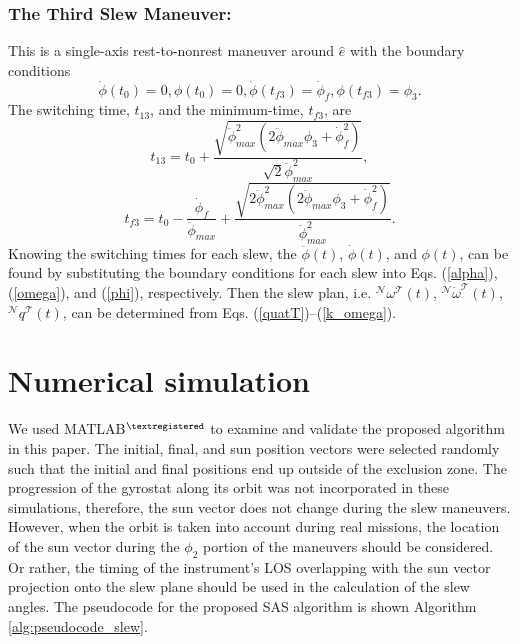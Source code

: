 \documentclass[journal ]{new-aiaa}
\begin{document}
	\subsubsection{The Third Slew Maneuver:}
	 This is a  single-axis rest-to-nonrest maneuver around $\hat{e}$ with the boundary conditions
	\begin{equation}\label{Bc3}
	\dot{\phi}(t_0)=0,\phi(t_0)=0, \dot{\phi}(t_{f3})=\dot{\phi}_{f},\phi(t_{f3})=\phi_3.
	\end{equation}
	The switching time, $t_{13}$, and the minimum-time, $t_{f3}$, are
	\begin{equation}\label{t31}
	t_{13}=t_0+\frac{\sqrt{\ddot{\phi}_{max}^2(2\ddot{\phi}_{max}\phi_3+\dot{\phi}_{f}^2)}}{\sqrt{2}\ddot{\phi}_{max}^2},
	\end{equation}
	\begin{equation}\label{tf3}
	t_{f3}=t_0-\frac{\dot{\phi}_{f}}{\ddot{\phi}_{max}}+\frac{\sqrt{2\ddot{\phi}_{max}^2(2\ddot{\phi}_{max}\phi_3+\dot{\phi}_{f}^2)}}{\ddot{\phi}_{max}^2}.
	\end{equation}
	Knowing the switching times for each slew, the $\ddot{\phi}(t)$, $\dot{\phi}(t)$, and  $\phi(t)$, can be found by substituting the boundary conditions for each slew into Eqs. (\ref{alpha}), (\ref{omega}), and (\ref{phi}), respectively. Then the slew plan, i.e. $^\mathcal{N}\omega^\mathcal{T}(t)$, $^\mathcal{N}\dot{\omega}^\mathcal{T}(t)$, $^\mathcal{N}q^\mathcal{T}(t)$, can be determined from Eqs. (\ref{quatT})--(\ref{k_omega}).	
\section{Numerical simulation} 
We used MATLAB$^{\textregistered}$ to examine and validate the proposed algorithm in this paper. The initial, final, and sun position vectors were selected randomly such that the initial and final positions end up outside of the exclusion zone. The progression of the gyrostat along its orbit was not incorporated in these simulations, therefore, the sun vector does not change during the slew maneuvers. However, when the orbit is taken into account during real missions, the location of the sun vector during the $\phi_2$ portion of the maneuvers should be considered. Or rather, the timing of the instrument's LOS overlapping with the sun vector projection onto the slew plane should be used in the calculation of the slew angles. 
The pseudocode for the proposed SAS algorithm is shown Algorithm \ref{alg:pseudocode_slew}.   
\end{document}
